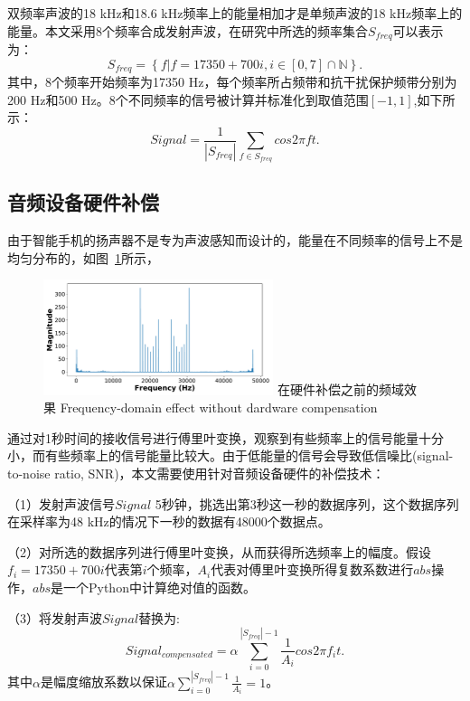 双频率声波的18 kHz和18.6 kHz频率上的能量相加才是单频声波的18 kHz频率上的能量。本文采用8个频率合成发射声波，在研究中所选的频率集合$S_{freq}$可以表示为：
\begin{equation}
  S_{freq}=  \left\lbrace f | f=17350+700i, i \in \left[ 0,7 \right] \cap \mathbb{N} \right\rbrace.
\end{equation}
其中，8个频率开始频率为17350 Hz，每个频率所占频带和抗干扰保护频带分别为200 Hz和500 Hz。8个不同频率的信号被计算并标准化到取值范围$[-1,1]$,如下所示：
\begin{equation}
  Signal=\frac{1}{|S_{freq}|}\sum_{f \in S_{freq}}cos 2\pi ft.
\end{equation}

\subsection{音频设备硬件补偿}
由于智能手机的扬声器不是专为声波感知而设计的，能量在不同频率的信号上不是均匀分布的，如图~\ref{fig:nocompensation}所示，
\begin{figure}[!htp]
  \centering
  \includegraphics[width=0.6\textwidth]{figure/nocompensation.pdf}
  \bicaption
    {在硬件补偿之前的频域效果}
    {Frequency-domain effect without dardware compensation}
  \label{fig:nocompensation}
\end{figure}
通过对1秒时间的接收信号进行傅里叶变换，观察到有些频率上的信号能量十分小，而有些频率上的信号能量比较大。由于低能量的信号会导致低信噪比(signal-to-noise ratio, SNR)，本文需要使用针对音频设备硬件的补偿技术：

（1）发射声波信号$Signal$ 5秒钟，挑选出第3秒这一秒的数据序列，这个数据序列在采样率为48 kHz的情况下一秒的数据有48000个数据点。

（2）对所选的数据序列进行傅里叶变换，从而获得所选频率上的幅度。假设$f_{i} = 17350 + 700i$代表第$i$个频率，$A_{i}$代表对傅里叶变换所得复数系数进行$abs$操作，$abs$是一个Python中计算绝对值的函数。

（3）将发射声波$Signal$替换为:
\begin{equation}
Signal_{compensated}=\alpha \sum_{i=0}^{|S_{freq}|-1} \frac{1}{A_i} cos 2\pi f_{i}t.
\end{equation}
其中$\alpha$是幅度缩放系数以保证$\alpha \sum_{i=0}^{|S_{freq}|-1}\frac{1}{A_i}=1$。

